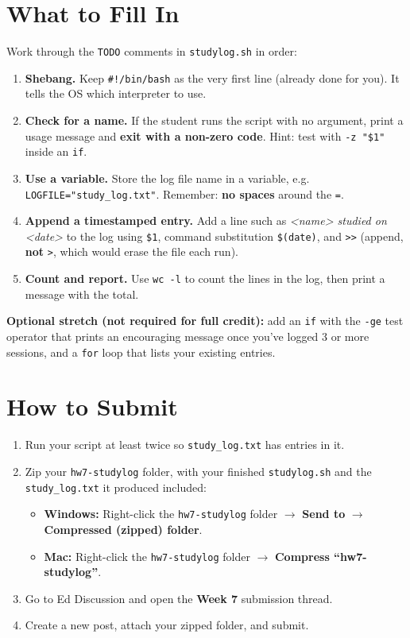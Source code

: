 \documentclass[11pt]{article}
\begin{document}
\section{What to Fill In}
Work through the \texttt{TODO} comments in \texttt{studylog.sh} in order:
\begin{enumerate}
    \item \textbf{Shebang.} Keep \texttt{\#!/bin/bash} as the very first line (already done for you). It tells the OS which interpreter to use.
    \item \textbf{Check for a name.} If the student runs the script with no argument, print a usage message and \textbf{exit with a non-zero code}. Hint: test with \texttt{-z "\$1"} inside an \texttt{if}.
    \item \textbf{Use a variable.} Store the log file name in a variable, e.g. \texttt{LOGFILE="study\_log.txt"}. Remember: \textbf{no spaces} around the \texttt{=}.
    \item \textbf{Append a timestamped entry.} Add a line such as \textit{\textless name\textgreater{} studied on \textless date\textgreater} to the log using \texttt{\$1}, command substitution \texttt{\$(date)}, and \texttt{>{}>} (append, \textbf{not} \texttt{>}, which would erase the file each run).
    \item \textbf{Count and report.} Use \texttt{wc -l} to count the lines in the log, then print a message with the total.
\end{enumerate}
\textbf{Optional stretch (not required for full credit):} add an \texttt{if} with the \texttt{-ge} test operator that prints an encouraging message once you've logged 3 or more sessions, and a \texttt{for} loop that lists your existing entries.

\section{How to Submit}
\begin{enumerate}
    \item Run your script at least twice so \texttt{study\_log.txt} has entries in it.
    \item Zip your \texttt{hw7-studylog} folder, with your finished \texttt{studylog.sh} and the \texttt{study\_log.txt} it produced included:
    \begin{itemize}
        \item \textbf{Windows:} Right-click the \texttt{hw7-studylog} folder \(\rightarrow\) \textbf{Send to} \(\rightarrow\) \textbf{Compressed (zipped) folder}.
        \item \textbf{Mac:} Right-click the \texttt{hw7-studylog} folder \(\rightarrow\) \textbf{Compress ``hw7-studylog''}.
    \end{itemize}
    \item Go to Ed Discussion and open the \textbf{Week 7} submission thread.
    \item Create a new post, attach your zipped folder, and submit.
\end{enumerate}
\end{document}

